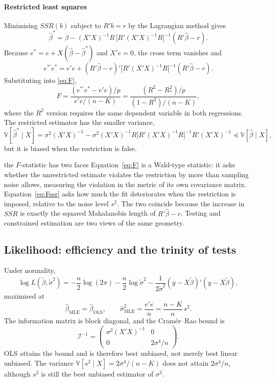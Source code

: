 \documentclass[11pt,a4paper]{article}
\newcommand{\V}{\mathbb{V}}
\newcommand{\bh}{\hat\beta}
\begin{document}
\paragraph{Restricted least squares}
Minimising $SSR(b)$ subject to $R'b=r$ by the Lagrangian method gives
\[
\bh^* = \bh - (X'X)^{-1}R\,\big[R'(X'X)^{-1}R\big]^{-1}(R'\bh-r).
\]
Because $e^*=e+X(\bh-\bh^*)$ and $X'e=0$, the cross term vanishes and
\[
e^{*\prime}e^* = e'e + (R'\bh-r)'\big[R'(X'X)^{-1}R\big]^{-1}(R'\bh-r).
\]
Substituting into \eqref{eq:F},
\begin{equation}\label{eq:Fssr}
F=\frac{(e^{*\prime}e^*-e'e)/p}{e'e/(n-K)}=\frac{(R^2-R_*^2)/p}{(1-R^2)/(n-K)},
\end{equation}
where the $R^2$ version requires the same dependent variable in both regressions. The restricted estimator has the smaller variance,
\[
\V[\bh^*\mid X]=\sigma^2(X'X)^{-1}-\sigma^2(X'X)^{-1}R\big[R'(X'X)^{-1}R\big]^{-1}R'(X'X)^{-1}\preceq\V[\bh\mid X],
\]
but it is biased when the restriction is false.

\begin{whybox}{the $F$-statistic has two faces}
Equation~\eqref{eq:F} is a Wald-type statistic: it asks whether the unrestricted estimate violates the restriction by more than sampling noise allows, measuring the violation in the metric of its own covariance matrix. Equation~\eqref{eq:Fssr} asks how much the fit deteriorates when the restriction is imposed, relative to the noise level $s^2$. The two coincide because the increase in $SSR$ is exactly the squared Mahalanobis length of $R'\bh-r$. Testing and constrained estimation are two views of the same geometry.
\end{whybox}

\subsection{Likelihood: efficiency and the trinity of tests}\label{sec:ml}

Under normality,
\[
\log L(\tilde\beta,\tilde\sigma^2) = -\frac n2\log(2\pi)-\frac n2\log\tilde\sigma^2-\frac{1}{2\tilde\sigma^2}(y-X\tilde\beta)'(y-X\tilde\beta),
\]
maximised at
\[
\bh_{\mathrm{MLE}}=\bh_{\mathrm{OLS}},\qquad \hat\sigma^2_{\mathrm{MLE}}=\frac{e'e}{n}=\frac{n-K}{n}\,s^2 .
\]
The information matrix is block diagonal, and the Cram\'er--Rao bound is
\[
\mathcal I^{-1}=\begin{pmatrix}\sigma^2(X'X)^{-1}&0\\[2pt]0&2\sigma^4/n\end{pmatrix}.
\]
OLS attains the bound and is therefore best unbiased, not merely best linear unbiased. The variance $\V[s^2\mid X]=2\sigma^4/(n-K)$ does not attain $2\sigma^4/n$, although $s^2$ is still the best unbiased estimator of $\sigma^2$.
\end{document}
